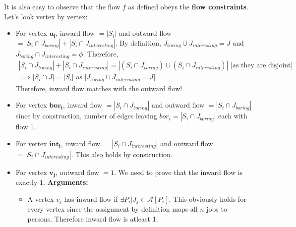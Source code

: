 \documentclass[11pt, fleqn]{article}
\begin{document}
\begin{itemize}
    It is also easy to observe that the flow $f$ as defined obeys the \textbf{flow constraints}. Let's look vertex by vertex:
    \begin{itemize}
        \item For vertex $\boldsymbol{u_i}$, inward flow $= |S_i|$ and outward flow $= |S_i \cap J_{boring}| + |S_i \cap J_{interesting}| $. By definition, $J_{boring} \cup J_{interesting} = J$ and $J_{boring} \cap J_{interesting} = \phi$. Therefore, 
        \begin{equation*}
            \begin{gathered}
                |S_i \cap J_{boring}| + |S_i \cap J_{interesting}| = |(S_i \cap J_{boring}) \cup (S_i \cap J_{interesting})| \text{ [as they are disjoint]}\\
                \implies |S_i \cap J| = |S_i| \text{   as [$J_{boring} \cup J_{interesting} = J$]}
            \end{gathered}
        \end{equation*}
        Therefore, inward flow matches with the outward flow!
        
        \item For vertex $\boldsymbol{bor_i}$, inward flow $= |S_i \cap J_{boring}|$ and outward flow $= |S_i \cap J_{boring}|$ since by construction, number of edges leaving $bor_i = |S_i \cap J_{boring}|$ each with flow 1.
        
        \item For vertex $\boldsymbol{int_i}$, inward flow $= |S_i \cap J_{interesting}|$ and outward flow $= |S_i \cap J_{interesting}|$. This also holds by construction.
        
        \item For vertex $\boldsymbol{v_j}$, outward flow $= 1$. We need to prove that the inward flow is exactly $1$. \textbf{Arguments: }
        \begin{itemize}
            \item A vertex $v_j$ has inward flow if $\exists P_i | J_j \in \mathcal{A}[P_i]$. This obviously holds for every vertex since the assignment by definition maps all $n$ jobs to persons. Therefore inward flow is atleast 1.
            

\end{itemize}
\end{itemize}
\end{itemize}
\end{document}
